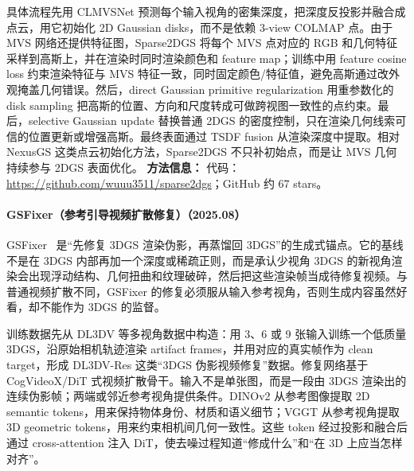 具体流程先用 CLMVSNet 预测每个输入视角的密集深度，把深度反投影并融合成点云，用它初始化 2D Gaussian disks，而不是依赖 3-view COLMAP 点。由于 MVS 网络还提供特征图，Sparse2DGS 将每个 MVS 点对应的 RGB 和几何特征采样到高斯上，并在渲染时同时渲染颜色和 feature map；训练中用 feature cosine loss 约束渲染特征与 MVS 特征一致，同时固定颜色/特征值，避免高斯通过改外观掩盖几何错误。然后，direct Gaussian primitive regularization 用重参数化的 disk sampling 把高斯的位置、方向和尺度转成可做跨视图一致性的点约束。最后，selective Gaussian update 替换普通 2DGS 的密度控制，只在渲染几何线索可信的位置更新或增强高斯。最终表面通过 TSDF fusion 从渲染深度中提取。相对 NexusGS 这类点云初始化方法，Sparse2DGS 不只补初始点，而是让 MVS 几何持续参与 2DGS 表面优化。
\textbf{方法信息：} 代码：\url{https://github.com/wuuu3511/sparse2dgs}；GitHub 约 67 stars。



\paragraph{GSFixer（参考引导视频扩散修复）（2025.08）}
GSFixer~\cite{2508_09667} 是“先修复 3DGS 渲染伪影，再蒸馏回 3DGS”的生成式锚点。它的基线不是在 3DGS 内部再加一个深度或稀疏正则，而是承认少视角 3DGS 的新视角渲染会出现浮动结构、几何扭曲和纹理破碎，然后把这些渲染帧当成待修复视频。与普通视频扩散不同，GSFixer 的修复必须服从输入参考视角，否则生成内容虽然好看，却不能作为 3DGS 的监督。

训练数据先从 DL3DV 等多视角数据中构造：用 3、6 或 9 张输入训练一个低质量 3DGS，沿原始相机轨迹渲染 artifact frames，并用对应的真实帧作为 clean target，形成 DL3DV-Res 这类“3DGS 伪影视频修复”数据。修复网络基于 CogVideoX/DiT 式视频扩散骨干。输入不是单张图，而是一段由 3DGS 渲染出的连续伪影帧；两端或邻近参考视角提供条件。DINOv2 从参考图像提取 2D semantic tokens，用来保持物体身份、材质和语义细节；VGGT 从参考视角提取 3D geometric tokens，用来约束相机间几何一致性。这些 token 经过投影和融合后通过 cross-attention 注入 DiT，使去噪过程知道“修成什么”和“在 3D 上应当怎样对齐”。

